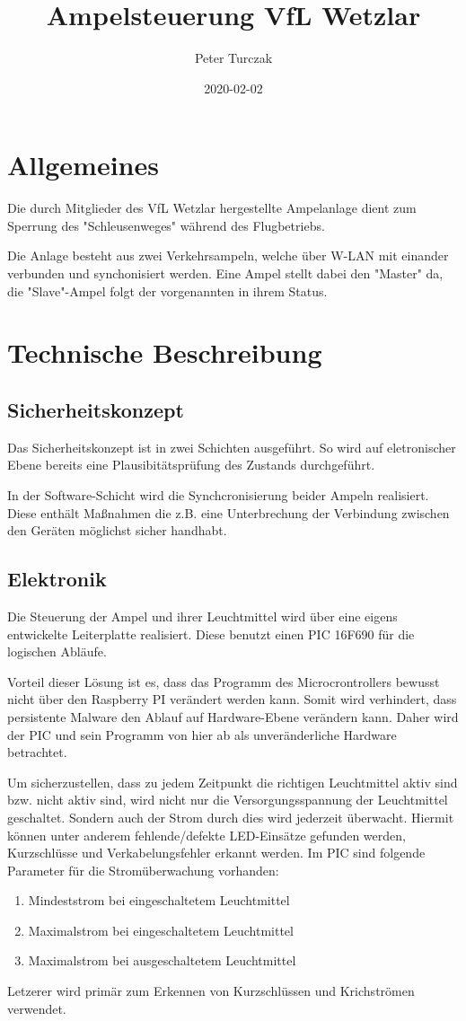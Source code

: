 \documentclass[a4paper, ngerman]{scrartcl}
\begin{document}
\title{Ampelsteuerung VfL Wetzlar}
\author{Peter Turczak}
\date{2020-02-02}
\maketitle
\tableofcontents
\clearpage
\section{Allgemeines}
Die durch Mitglieder des VfL Wetzlar hergestellte Ampelanlage dient zum Sperrung des "Schleusenweges" während des Flugbetriebs.

Die Anlage besteht aus zwei Verkehrsampeln, welche über W-LAN mit einander verbunden und synchonisiert werden. Eine Ampel stellt dabei den "Master" da, die "Slave"-Ampel folgt der vorgenannten in ihrem Status.


\section{Technische Beschreibung}
\subsection{Sicherheitskonzept}
Das Sicherheitskonzept ist in zwei Schichten ausgeführt. So wird auf eletronischer Ebene bereits eine Plausibitätsprüfung des Zustands durchgeführt.

In der Software-Schicht wird die Synchcronisierung beider Ampeln realisiert. Diese enthält Maßnahmen die z.B. eine Unterbrechung der Verbindung zwischen den Geräten möglichst sicher handhabt.
\subsection{Elektronik}
Die Steuerung der Ampel und ihrer Leuchtmittel wird über eine eigens entwickelte Leiterplatte realisiert. Diese benutzt einen PIC 16F690 für die logischen Abläufe.

Vorteil dieser Lösung ist es, dass das Programm des Microcrontrollers bewusst nicht über den Raspberry PI verändert werden kann. Somit wird verhindert, dass persistente Malware den Ablauf auf Hardware-Ebene verändern kann. Daher wird der PIC und sein Programm von hier ab als unveränderliche Hardware betrachtet.

Um sicherzustellen, dass zu jedem Zeitpunkt die richtigen Leuchtmittel aktiv sind bzw. nicht aktiv sind, wird nicht nur die Versorgungsspannung der Leuchtmittel geschaltet. Sondern auch der Strom durch dies wird jederzeit überwacht. Hiermit können unter anderem fehlende/defekte LED-Einsätze gefunden werden, Kurzschlüsse und Verkabelungsfehler erkannt werden. Im PIC sind folgende Parameter für die Stromüberwachung vorhanden:
\begin{enumerate}
	\item Mindeststrom bei eingeschaltetem Leuchtmittel
	\item Maximalstrom bei eingeschaltetem Leuchtmittel
	\item Maximalstrom bei ausgeschaltetem Leuchtmittel
\end{enumerate}
Letzerer wird primär zum Erkennen von Kurzschlüssen und Krichströmen verwendet.
\end{document}
